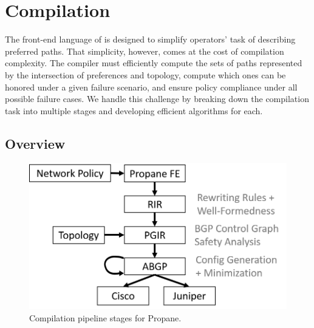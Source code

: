 \section{Compilation}
\label{sec:compilation}

The front-end language of \sysname is designed to simplify operators' task of describing preferred paths. That simplicity, however, comes at the cost of compilation complexity. The compiler must efficiently compute the sets of paths represented by the intersection of preferences and topology, compute which ones can be honored under a given failure scenario, and ensure policy compliance under all possible failure cases. We handle this challenge by breaking down the compilation task into multiple stages and developing efficient algorithms for each.

\subsection{Overview}

\begin{figure}[t!]
\centering
\includegraphics[width=.9\columnwidth]{figures/pipeline}
\caption{Compilation pipeline stages for Propane.}
\label{fig:pipeline}
\end{figure}


